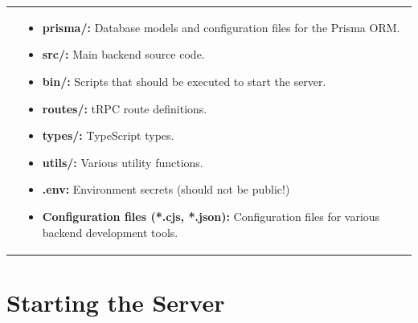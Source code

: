 \documentclass[notitlepage, 12pt]{report}
\begin{document}
\noindent\begin{xltabular}{\textwidth}{
		@{}
		p{0.3\textwidth}
		X
	}
	&
	\begin{itemize}[label={}, leftmargin=5pt]
		\item	\textbf{prisma/:} Database models and configuration files for the Prisma ORM.
		\item	\textbf{src/:} Main backend source code.
		\item	\textbf{bin/:} Scripts that should be executed to start the server.
		\item	\textbf{routes/:} tRPC route definitions.
		\item	\textbf{types/:} TypeScript types.
		\item	\textbf{utils/:} Various utility functions.
		\item	\textbf{.env:} Environment secrets (should not be public!)
		\item	\textbf{Configuration files (*.cjs, *.json):} Configuration files for various backend development tools.
	\end{itemize}
\end{xltabular}

\newpage

\section*{Starting the Server}
\end{document}
